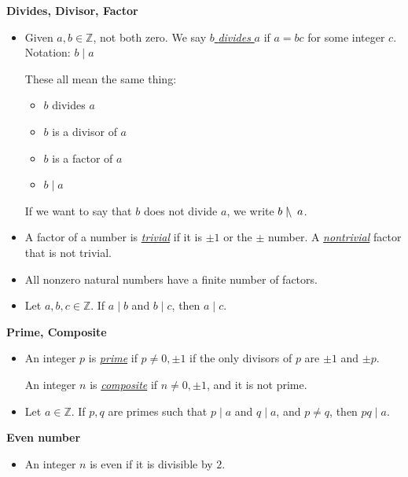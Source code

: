 \documentclass[11pt]{article}
\newcommand{\Z}{\mathbb{Z}}
\newcommand\divides{\;|\;}
\newcommand\notdivides{\;|\hspace{-2pt}\backslash\hspace{2pt}\;}
\theoremstyle{definition}
\begin{document}
\vspace*{4pt}
{\bf Divides, Divisor, Factor} 

\vspace*{-8pt}
\begin{itemize}
\item  Given $a, b\in \Z$, not both zero. We say \underline{$b$ {\it divides} $a$}  if $a=bc$ for some integer $c$.   Notation: $b\divides a$
		 
		 These all mean the same thing:
		\begin{itemize}[label={$\circ$}]
		\item $b$ divides $a$
		\item $b$ is a divisor of $a$
		\item $b$ is a factor of $a$
		\item $b\divides a$
		\end{itemize}
		
		 If we want to say that $b$ does not divide $a$, we write $b\notdivides a$.

\item A factor of a number is \underline {\it trivial} if it is $\pm 1$ or the $\pm$ number.  A \underline{\it nontrivial} factor that is not trivial.

\item All nonzero natural numbers have a finite number of factors.

\item Let $a,b,c\in \Z$. If $a\divides b$ and $b\divides c$, then $a\divides c$.
\end{itemize}

{\bf Prime, Composite} 
\vspace*{-6pt}
\begin{itemize} 
\item An integer $p$ is \underline{{\it prime}} if $p\neq 0, \pm1 $ if the only divisors of $p$ are $\pm 1$ and $\pm p$. 

An integer $n$ is \underline{\it composite} if $n\neq 0, \pm 1$, and it is not prime.

\item Let $a\in \Z$. If $p,q$ are primes such that $p\divides a$ and $q\divides a$, and $p\neq q$, then $pq\divides a$.
\end{itemize}

{\bf Even number}
\vspace*{-6pt}
\begin{itemize} 
\item[] An integer $n$ is even if it is divisible by $2$.
\end{itemize}
\end{document}
